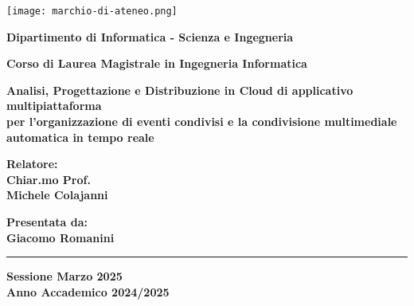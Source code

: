 
\begin{titlepage}
    
\pagestyle{empty}


\begin{center}

\texttt{[image: marchio-di-ateneo.png]}

\vspace{10mm}

{\large{\bf{Dipartimento di Informatica - Scienza e Ingegneria}}} 

\vspace{5mm}

{\Large{\bf{Corso di Laurea Magistrale in Ingegneria Informatica}}}

\vspace{15mm}

{\Huge{\bf Analisi, Progettazione e Distribuzione in Cloud di applicativo multipiattaforma}}\\
\vspace{3mm}
{\Huge{\bf per l'organizzazione di eventi condivisi e la condivisione multimediale automatica in tempo reale}}\\
\vspace{3mm}
\vspace{3mm}

\end{center}

\vspace{10mm}

\begin{minipage}[t]{0.40\textwidth}
{\Large{\bf Relatore: \\ Chiar.mo Prof.\\ Michele Colajanni}}

\vspace{3mm}

{\Large{\bf }}
\end{minipage}
\hfill
\begin{minipage}[t]{0.40\textwidth}\raggedleft
{\Large{\bf Presentata da: \\ Giacomo Romanini}}
\end{minipage}

\vspace{30mm}

\rule[0.5cm]{15.8cm}{0.6mm}

\begin{center}
{\large{\bf Sessione Marzo 2025 \\}}
{\large{\bf Anno Accademico 2024/2025\\}}
\end{center}

\end{titlepage}

\restoregeometry
\newpage
